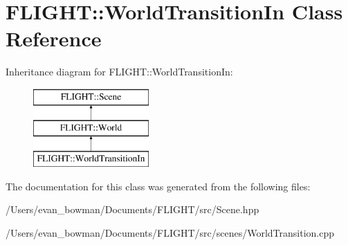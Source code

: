 \hypertarget{class_f_l_i_g_h_t_1_1_world_transition_in}{}\section{F\+L\+I\+G\+HT\+:\+:World\+Transition\+In Class Reference}
\label{class_f_l_i_g_h_t_1_1_world_transition_in}
Inheritance diagram for F\+L\+I\+G\+HT\+:\+:World\+Transition\+In\+:\begin{figure}[H]
\begin{center}
\leavevmode
\includegraphics[height=3.000000cm]{class_f_l_i_g_h_t_1_1_world_transition_in}
\end{center}
\end{figure}


The documentation for this class was generated from the following files\+:\begin{DoxyCompactItemize}
\item 
/\+Users/evan\+\_\+bowman/\+Documents/\+F\+L\+I\+G\+H\+T/src/Scene.\+hpp\item 
/\+Users/evan\+\_\+bowman/\+Documents/\+F\+L\+I\+G\+H\+T/src/scenes/World\+Transition.\+cpp\end{DoxyCompactItemize}
